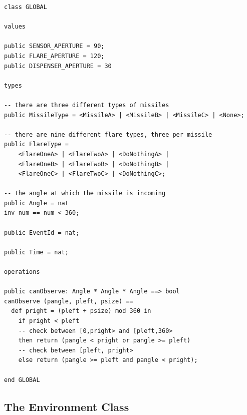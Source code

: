 \documentclass{overturerepchap}
\begin{document}
\begin{lstlisting}
class GLOBAL

values

public SENSOR_APERTURE = 90;
public FLARE_APERTURE = 120;
public DISPENSER_APERTURE = 30

types

-- there are three different types of missiles
public MissileType = <MissileA> | <MissileB> | <MissileC> | <None>;

-- there are nine different flare types, three per missile
public FlareType =
    <FlareOneA> | <FlareTwoA> | <DoNothingA> | 
    <FlareOneB> | <FlareTwoB> | <DoNothingB> | 
    <FlareOneC> | <FlareTwoC> | <DoNothingC>;

-- the angle at which the missile is incoming
public Angle = nat
inv num == num < 360;

public EventId = nat;

public Time = nat;

operations

public canObserve: Angle * Angle * Angle ==> bool
canObserve (pangle, pleft, psize) ==
  def pright = (pleft + psize) mod 360 in
    if pright < pleft
    -- check between [0,pright> and [pleft,360>
    then return (pangle < pright or pangle >= pleft)
    -- check between [pleft, pright>
    else return (pangle >= pleft and pangle < pright);

end GLOBAL
\end{lstlisting}

\subsection{The Environment Class}
\end{document}
